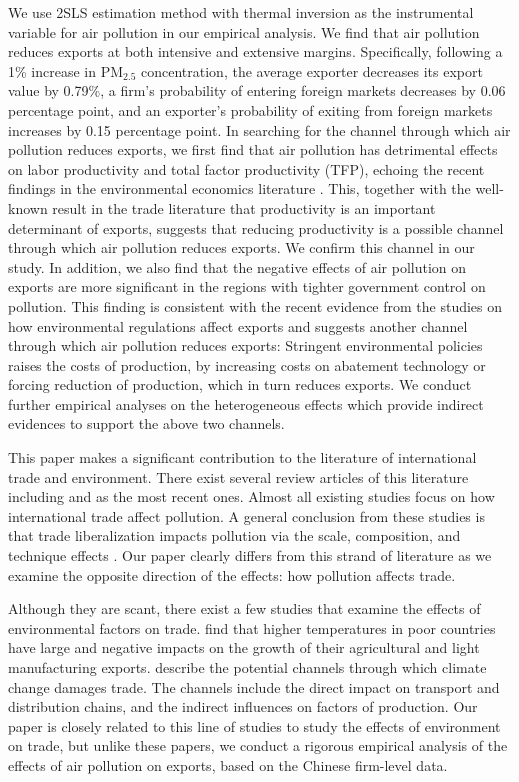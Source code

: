 \documentclass[12pt]{article}
\begin{document}
We use 2SLS estimation method with thermal inversion as the instrumental
variable for air pollution in our empirical analysis. We find that air
pollution reduces exports at both intensive and extensive margins.
Specifically, following a 1\% increase in $\mathrm{PM_{2.5}}$ concentration,
the average exporter decreases its export value by 0.79\%, a firm's
probability of entering foreign markets decreases by 0.06 percentage point,
and an exporter's probability of exiting from foreign markets increases by
0.15 percentage point. In searching for the channel through which air
pollution reduces exports, we first find that air pollution has detrimental
effects on labor productivity and total factor productivity (TFP), echoing
the recent findings in the environmental economics literature %
\citep{NBERw18392,fu2021air,NBERw28401}. This, together with the well-known result in the
trade literature that productivity is an important determinant of exports,
suggests that reducing productivity is a possible channel through which air
pollution reduces exports. We confirm this channel in our study. In
addition, we also find that the negative effects of air pollution on exports
are more significant in the regions with tighter government control on
pollution. This finding is consistent with the recent evidence from the
studies on how environmental regulations affect exports \citep[e.g.,][]{
cherniwchan2022environmental} and suggests another channel through which air
pollution reduces exports: Stringent environmental policies raises the costs
of production, by increasing costs on abatement technology or forcing
reduction of production, which in turn reduces exports. We conduct further
empirical analyses on the heterogeneous effects which provide indirect
evidences to support the above two channels.

This paper makes a significant contribution to the literature of
international trade and environment. There exist several review articles of
this literature including \cite{cherniwchan2017trade} and \cite{NBERw30020}
as the most recent ones. Almost all existing studies focus on how
international trade affect pollution. A general conclusion from these
studies is that trade liberalization impacts pollution via the scale,
composition, and technique effects \citep{NBERw3914,copeland1994north}. Our
paper clearly differs from this strand of literature as we examine the
opposite direction of the effects: how pollution affects trade.

Although they are scant, there exist a few studies that examine the effects
of environmental factors on trade. \cite{jones2010climate} find that higher
temperatures in poor countries have large and negative impacts on the growth
of their agricultural and light manufacturing exports. \cite%
{dellink2017international} describe the potential channels through which
climate change damages trade. The channels include the direct impact on
transport and distribution chains, and the indirect influences on factors of
production. Our paper is closely related to this line of studies to study
the effects of environment on trade, but unlike these papers, we conduct a
rigorous empirical analysis of the effects of air pollution on exports,
based on the Chinese firm-level data.
\end{document}
